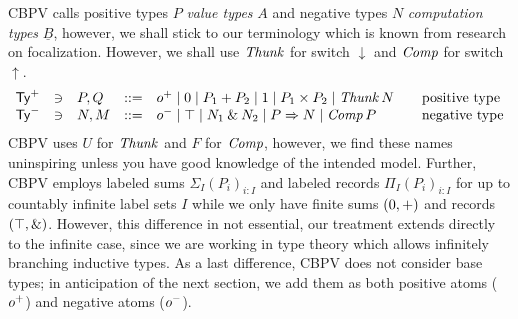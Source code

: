 \documentclass[a4paper,USenglish,cleveref, autoref]{lipics-v2019}
\begin{document}
CBPV calls positive types $P$ \emph{value types} $A$ and negative
types $N$
\emph{computation types} $\underline B$,
however, we shall stick to our terminology
which is known from research on focalization.
However, we shall use $\mathit{Thunk}$ for switch $\downarrow$ and $\mathit{Comp}$ for
switch $\uparrow$.
\[
\begin{array}{lllrl@{\qquad}l}
  \PTy & \ni & P,Q & ::= & \patom
    \mid \tyzero \mid P_1 + P_2
    \mid \tyone \mid P_1 \times P_2
    \mid \Thunk N
  & \mbox{positive type}
\\
  \NTy & \ni & N,M & ::= & \natom
    \mid \top \mid N_1 \ntimes N_2
    \mid P \To N
    \mid \Comp P
  & \mbox{negative type}
\\
\end{array}
\]
CBPV uses $U$ for $\mathit{Thunk}$ and $F$ for $\mathit{Comp}$, however, we find
these names uninspiring unless you have good knowledge of the intended
model.  Further, CBPV employs labeled sums $\Sigma_I (P_i)_{i : I}$
and labeled records $\Pi_I (P_i)_{i : I}$ for up to countably infinite
label sets $I$ while we only have finite sums $(0,+)$ and
records $(\top,\mathbin{\&})$.  However, this difference in not essential,
our treatment extends directly to the infinite case, since we are
working in type theory which allows infinitely branching inductive
types.   As a last difference, CBPV does not consider base types; in
anticipation of the next section, we add them as both positive atoms
($o^+$) and negative atoms ($o^-$).
\end{document}
